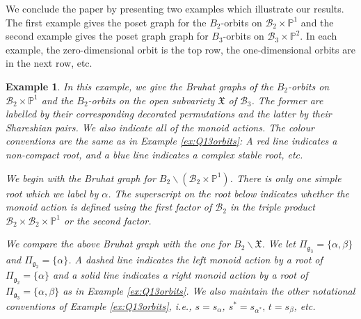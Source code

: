 \documentclass[12pt]{amsart}
\numberwithin{equation}{section}
\newtheorem{exam}[thm]{Example}
\newcommand{\fg}{\mbox{${\mathfrak g}$}}
\newcommand{\B}{\mathcal{B}}
\begin{document}
We conclude the paper by presenting two examples which illustrate our results.  The first example gives the poset graph for the $B_{2}$-orbits on $\B_{2}\times\mathbb{P}^{1}$ and the second example gives the poset graph graph for $B_{3}$-orbits on $\B_{3}\times\mathbb{P}^{2}.$  In each example, the zero-dimensional orbit is the top row, the one-dimensional orbits are in the next row, etc.

\begin{exam}\label{eq:2x2example}
In this example, we give the Bruhat graphs of the $B_{2}$-orbits on 
$\B_{2}\times\mathbb{P}^{1}$ and the $B_{2}$-orbits on the open subvariety $\mathfrak{X}$ of $\B_{3}$.  The former are labelled by their corresponding decorated permutations and the latter by their Shareshian pairs.  We also indicate all of the monoid actions.  The colour conventions are the same as in Example \ref{ex:Q13orbits}: A red line indicates a non-compact root, and a blue line indicates a complex stable root, etc.


We begin with the Bruhat graph for $B_{2}\backslash (\B_{2}\times\mathbb{P}^{1})$.  There is only one simple root which we label by $\alpha$.   The superscript on the root below indicates whether the monoid action is defined using the first factor of $\B_{2}$ in the triple product $\B_{2}\times\B_{2}\times \mathbb{P}^{1}$ or the second factor.  

\begin{center}
\end{center}

We compare the above Bruhat graph with the one for $B_{2}\backslash\mathfrak{X}$.  We let $\Pi_{\fg_{3}}=\{\alpha,\beta\}$ and $\Pi_{\fg_{2}}=\{\alpha\}$.  A dashed line indicates the left monoid action by a root of $\Pi_{\fg_{2}}=\{\alpha\}$ and a solid line indicates a right monoid action by a root of $\Pi_{\fg_{3}}=\{\alpha,\beta\}$ as in Example \ref{ex:Q13orbits}.  We also maintain the other notational conventions of Example \ref{ex:Q13orbits}, i.e., $s=s_{\alpha}$, $s^{*}=s_{\alpha^{*}},\, t=s_{\beta}$, etc.



\end{exam}
\end{document}
